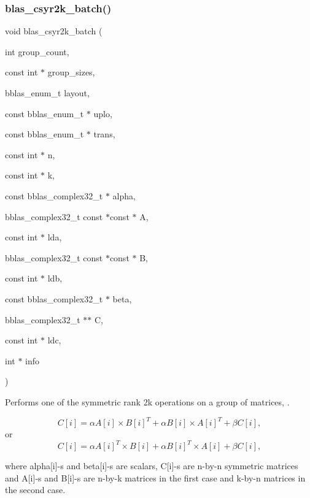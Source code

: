 \subsubsection{\texorpdfstring{blas\+\_\+csyr2k\+\_\+batch()}{blas\_csyr2k\_batch()}}
{\footnotesize\ttfamily void blas\+\_\+csyr2k\+\_\+batch (\begin{DoxyParamCaption}\item[{int}]{group\+\_\+count,  }\item[{const int $\ast$}]{group\+\_\+sizes,  }\item[{bblas\+\_\+enum\+\_\+t}]{layout,  }\item[{const bblas\+\_\+enum\+\_\+t $\ast$}]{uplo,  }\item[{const bblas\+\_\+enum\+\_\+t $\ast$}]{trans,  }\item[{const int $\ast$}]{n,  }\item[{const int $\ast$}]{k,  }\item[{const bblas\+\_\+complex32\+\_\+t $\ast$}]{alpha,  }\item[{bblas\+\_\+complex32\+\_\+t const $\ast$const $\ast$}]{A,  }\item[{const int $\ast$}]{lda,  }\item[{bblas\+\_\+complex32\+\_\+t const $\ast$const $\ast$}]{B,  }\item[{const int $\ast$}]{ldb,  }\item[{const bblas\+\_\+complex32\+\_\+t $\ast$}]{beta,  }\item[{bblas\+\_\+complex32\+\_\+t $\ast$$\ast$}]{C,  }\item[{const int $\ast$}]{ldc,  }\item[{int $\ast$}]{info }\end{DoxyParamCaption})}

Performs one of the symmetric rank 2k operations on a group of matrices, .

\[ C[i] = \alpha A[i] \times B[i]^T + \alpha B[i] \times A[i]^T + \beta C[i], \] or \[ C[i] = \alpha A[i]^T \times B[i] + \alpha B[i]^T \times A[i] + \beta C[i], \]

where alpha\mbox{[}i\mbox{]}-\/s and beta\mbox{[}i\mbox{]}-\/s are scalars, C\mbox{[}i\mbox{]}-\/s are n-\/by-\/n symmetric matrices and A\mbox{[}i\mbox{]}-\/s and B\mbox{[}i\mbox{]}-\/s are n-\/by-\/k matrices in the first case and k-\/by-\/n matrices in the second case.


